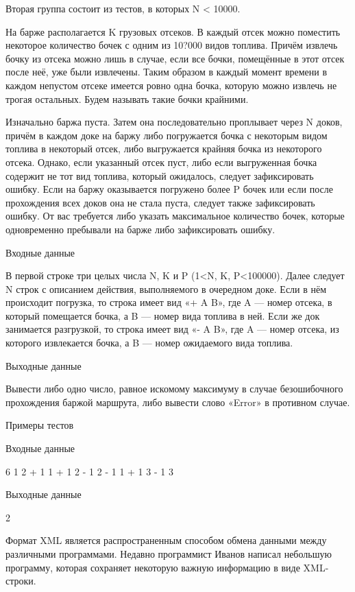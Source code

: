 \documentclass[]{article}
\begin{document}
Вторая группа состоит из тестов, в которых N < 10000.



На барже располагается K грузовых отсеков. В каждый отсек можно поместить некоторое количество бочек с одним из 10?000 видов топлива. Причём извлечь бочку из отсека можно лишь в случае, если все бочки, помещённые в этот отсек после неё, уже были извлечены. Таким образом в каждый момент времени в каждом непустом отсеке имеется ровно одна бочка, которую можно извлечь не трогая остальных. Будем называть такие бочки крайними.

Изначально баржа пуста. Затем она последовательно проплывает через N доков, причём в каждом доке на баржу либо погружается бочка с некоторым видом топлива в некоторый отсек, либо выгружается крайняя бочка из некоторого отсека. Однако, если указанный отсек пуст, либо если выгруженная бочка содержит не тот вид топлива, который ожидалось, следует зафиксировать ошибку. Если на баржу оказывается погружено более P бочек или если после прохождения всех доков она не стала пуста, следует также зафиксировать ошибку. От вас требуется либо указать максимальное количество бочек, которые одновременно пребывали на барже либо зафиксировать ошибку.

Входные данные

В первой строке три целых числа N, K и P (1<N, K, P<100000). Далее следует N строк с описанием действия, выполняемого в очередном доке. Если в нём происходит погрузка, то строка имеет вид «+ A B», где A — номер отсека, в который помещается бочка, а B — номер вида топлива в ней. Если же док занимается разгрузкой, то строка имеет вид «- A B», где A — номер отсека, из которого извлекается бочка, а B — номер ожидаемого вида топлива.

Выходные данные

Вывести либо одно число, равное искомому максимуму в случае безошибочного прохождения баржой маршрута, либо вывести слово «Error» в противном случае.

Примеры тестов

Входные данные

6 1 2
+ 1 1
+ 1 2
- 1 2
- 1 1
+ 1 3
- 1 3

Выходные данные

2


 Формат XML является распространенным способом обмена данными между различными программами. Недавно программист Иванов написал небольшую программу, которая сохраняет некоторую важную информацию в виде XML-строки.
\end{document}

